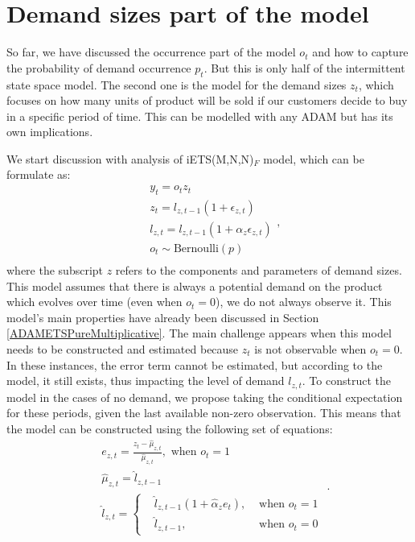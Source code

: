 \documentclass[
]{book}
\theoremstyle{definition}
\theoremstyle{definition}
\theoremstyle{definition}
\theoremstyle{definition}
\theoremstyle{remark}
\begin{document}
\hypertarget{ADAMDemandSizes}{%
\section{Demand sizes part of the model}\label{ADAMDemandSizes}}

So far, we have discussed the occurrence part of the model \(o_t\) and how to capture the probability of demand occurrence \(p_t\). But this is only half of the intermittent state space model. The second one is the model for the demand sizes \(z_t\), which focuses on how many units of product will be sold if our customers decide to buy in a specific period of time. This can be modelled with any ADAM but has its own implications.

We start discussion with analysis of iETS(M,N,N)\(_F\) model, which can be formulate as:
\begin{equation}
\begin{aligned}
& y_t = o_t z_t  \\
& z_t = l_{z,t-1}(1 + \epsilon_{z,t}) \\
& l_{z,t} = l_{z,t-1}(1  + \alpha_{z} \epsilon_{z,t}) \\
& o_t \sim \text{Bernoulli}(p) \\
\end{aligned},
\label{eq:iETSMNNFixed}
\end{equation}
where the subscript \(z\) refers to the components and parameters of demand sizes. This model assumes that there is always a potential demand on the product which evolves over time (even when \(o_t=0\)), we do not always observe it. This model's main properties have already been discussed in Section \ref{ADAMETSPureMultiplicative}. The main challenge appears when this model needs to be constructed and estimated because \(z_t\) is not observable when \(o_t=0\). In these instances, the error term cannot be estimated, but according to the model, it still exists, thus impacting the level of demand \(l_{z,t}\). To construct the model in the cases of no demand, we propose taking the conditional expectation for these periods, given the last available non-zero observation. This means that the model can be constructed using the following set of equations:
\begin{equation}
\begin{aligned}
& e_{z,t} = \frac{z_t -\hat{\mu}_{z,t}}{\hat{\mu}_{z,t}}, \text{ when } o_t=1 \\
& \hat{\mu}_{z,t} = \hat{l}_{z,t-1} \\
& \hat{l}_{z,t} = 
\left \lbrace \begin{aligned}
& \hat{l}_{z,t-1} (1 + \hat{\alpha}_z e_t ), & \text{ when } o_t=1 \\
& \hat{l}_{z,t-1} , & \text{ when } o_t=0
\end{aligned} \right.
\end{aligned}.
\label{eq:iETSMNNFixedConstruction}
\end{equation}
\end{document}
